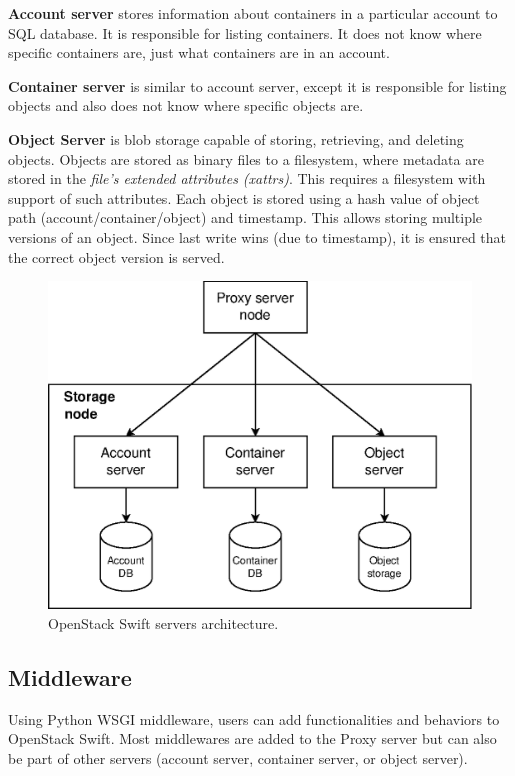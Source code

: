\documentclass{ExcelAtFIT}
\begin{document}
\textbf{Account server} stores information about containers in a particular account to SQL database. It is responsible for listing containers. It does not know where specific containers are, just what containers are in an account\cite{SwiftArchitecturalOverview}.

\textbf{Container server} is similar to account server, except it is responsible for listing objects and also does not know where specific objects are\cite{SwiftArchitecturalOverview}.

\textbf{Object Server} is blob storage capable of storing, retrieving, and deleting objects. Objects are stored as binary files to a filesystem, where metadata are stored in the \textit{file's extended attributes (xattrs)}. This requires a filesystem with support of such attributes. Each object is stored using a hash value of object path (account/container/object) and timestamp. This allows storing multiple versions of an object. Since last write wins (due to timestamp), it is ensured that the correct object version is served\cite{SwiftArchitecturalOverview}.

\begin{figure}[t]
		\centering
		\includegraphics[width=0.90\linewidth]{images/swift-servers.eps}
		\caption{OpenStack Swift servers architecture.}
		\label{fig:swiftServers}
\end{figure}


\subsection{Middleware}
Using Python WSGI middleware, users can add functionalities and behaviors to OpenStack Swift. Most middlewares are added to the Proxy server but can also be part of other servers (account server, container server, or object server).
\end{document}
